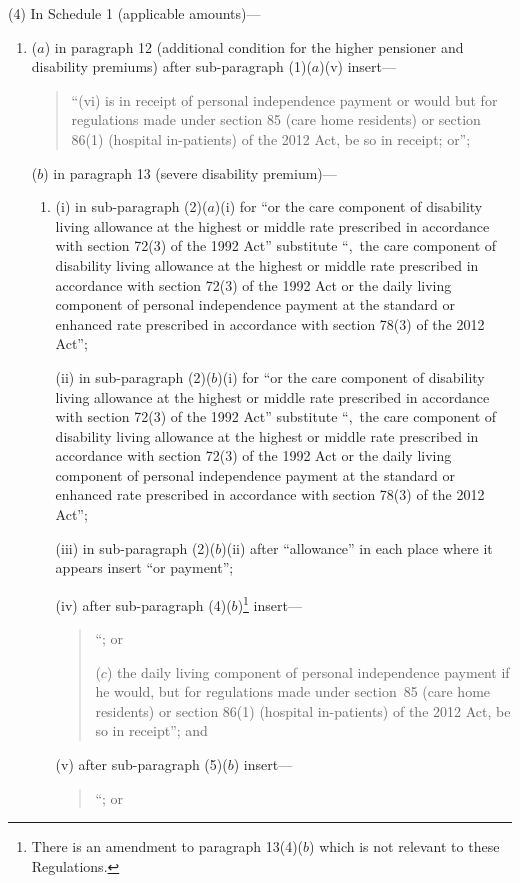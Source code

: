 \documentclass[12pt,a4paper]{article}
\begin{document}
(4) In Schedule 1 (applicable amounts)—
\begin{enumerate}\item[]
($a$) in paragraph 12 (additional condition for the higher pensioner and disability premiums) after sub-paragraph (1)($a$)(v)  insert—
\begin{quotation}
“(vi) is in receipt of personal independence payment or would but for regulations made under section 85 (care home residents) or section 86(1) (hospital in-patients) of the 2012 Act, be so in receipt; or”;
\end{quotation}

($b$) in paragraph 13 (severe disability premium)—
\begin{enumerate}\item[]
(i) in sub-paragraph (2)($a$)(i)  for “or the care component of disability living allowance at the highest or middle rate prescribed in accordance with section 72(3) of the 1992 Act” substitute “,~the care component of disability living allowance at the highest or middle rate prescribed in accordance with section 72(3) of the 1992 Act or the daily living component of personal independence payment at the standard or enhanced rate prescribed in accordance with section 78(3) of the 2012 Act”;

(ii) in sub-paragraph (2)($b$)(i)  for “or the care component of disability living allowance at the highest or middle rate prescribed in accordance with section 72(3) of the 1992 Act” substitute “,~the care component of disability living allowance at the highest or middle rate prescribed in accordance with section 72(3) of the 1992 Act or the daily living component of personal independence payment at the standard or enhanced rate prescribed in accordance with section 78(3) of the 2012 Act”;

(iii) in sub-paragraph (2)($b$)(ii)  after “allowance” in each place where it appears insert “or payment”;

(iv) after sub-paragraph (4)($b$)\footnote{There is an amendment to paragraph 13(4)($b$)  which is not relevant to these Regulations.} insert—
\begin{quotation}
“; or

($c$) the daily living component of personal independence payment if he would, but for regulations made under section~85 (care home residents) or section 86(1) (hospital in-patients) of the 2012 Act, be so in receipt”; and
\end{quotation}

(v) after sub-paragraph (5)($b$)  insert—
\begin{quotation}
“; or


\end{quotation}
\end{enumerate}
\end{enumerate}
\end{document}

